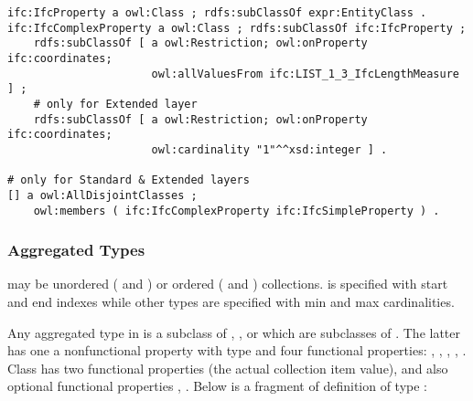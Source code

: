 \begin{lstlisting}
ifc:IfcProperty a owl:Class ; rdfs:subClassOf expr:EntityClass .
ifc:IfcComplexProperty a owl:Class ; rdfs:subClassOf ifc:IfcProperty ;
    rdfs:subClassOf [ a owl:Restriction; owl:onProperty ifc:coordinates;
                      owl:allValuesFrom ifc:LIST_1_3_IfcLengthMeasure ] ;
    # only for Extended layer
    rdfs:subClassOf [ a owl:Restriction; owl:onProperty ifc:coordinates;
                      owl:cardinality "1"^^xsd:integer ] .

# only for Standard & Extended layers
[] a owl:AllDisjointClasses ;
    owl:members ( ifc:IfcComplexProperty ifc:IfcSimpleProperty ) .
\end{lstlisting}


\subsubsection{Aggregated Types} may be unordered ( and ) or  ordered ( and ) collections. %
 is specified with start and end indexes while other types are specified with min and max cardinalities.

Any aggregated type in \ifcowl{} is a subclass of ,
,  or  which are subclasses of . The latter has one a nonfunctional property  with type  and four functional properties: , , , , . Class  has two functional properties  (the actual collection item value),  and also optional functional properties , . Below is a fragment of definition of type :


